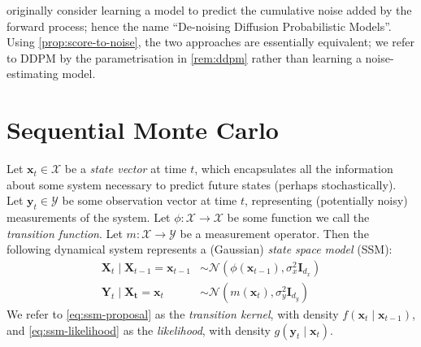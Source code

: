 \begin{remark}[De-noising]
    \textcite{hoDenoisingDiffusionProbabilistic2020} originally consider learning a model to
    predict the cumulative noise added by the forward process; hence the name ``De-noising
    Diffusion Probabilistic Models''. Using \ref{prop:score-to-noise}, the two approaches are
    essentially equivalent; we refer to DDPM by the parametrisation in \ref{rem:ddpm} rather than
    learning a noise-estimating model.
\end{remark}

\section{Sequential Monte Carlo}

\begin{definition} \label{def:ssm}
    Let $\mathbf{x}_t \in \mathcal{X}$ be a \emph{state vector} at time $t$, which encapsulates all
    the information about some system necessary to predict future states (perhaps stochastically).
    Let $\mathbf{y}_t \in \mathcal{Y}$ be some observation vector at time $t$, representing
    (potentially noisy) measurements of the system. Let $\phi: \mathcal{X} \to \mathcal{X}$ be some
    function we call the \emph{transition function}. Let $m: \mathcal{X} \to \mathcal{Y}$ be a
    measurement operator. Then the following dynamical system represents a (Gaussian)
    \emph{state space model} (SSM):
    \begin{align}
        \mathbf{X}_t \mid \mathbf{X}_{t-1} = \mathbf{x}_{t-1} &\sim \mathcal{N}(\phi(\mathbf{x}_{t-1}), \sigma_x^2 \mathbf{I}_{d_x}) \label{eq:ssm-proposal} \\
        \mathbf{Y}_t \mid \mathbf{X_t} = \mathbf{x}_t &\sim \mathcal{N}(m(\mathbf{x}_t), \sigma_y^2 \mathbf{I}_{d_y}) \label{eq:ssm-likelihood}
    \end{align}
    We refer to \autoref{eq:ssm-proposal} as the \emph{transition kernel}, with density
    $f(\mathbf{x}_t \mid \mathbf{x}_{t-1})$, and \autoref{eq:ssm-likelihood} as the \emph{likelihood},
    with density $g(\mathbf{y}_t \mid \mathbf{x}_t)$.
\end{definition}

